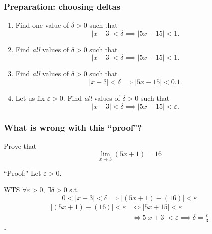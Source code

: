 \documentclass[14pt]{beamer}
\begin{document}
\begin{frame}[t]
	\frametitle{Preparation: choosing deltas}

	\begin{enumerate}
		\item Find one value of $\delta >0$ such that
			\[
				|x-3|< \delta \implies |5x-15|<1.
			\]

		\item Find \emph{all} values of $\delta >0$ such that
			\[
				|x-3|< \delta \implies |5x-15|<1.
			\]

		\item Find \emph{all} values of $\delta >0$ such that
			\[
				|x-3|< \delta \implies |5x-15|<0.1.
			\]

		\item Let us fix $\varepsilon >0$. Find \emph{all} values of $\delta >0$ such
			that
			\[
				|x-3|< \delta \implies |5x-15|<\varepsilon.
			\]
	\end{enumerate}
\end{frame}

\begin{frame}
	\frametitle{What is wrong with this ``proof"?}
	\fontsize{13}{13}\selectfont
	\vspace{-2mm}
	\begin{block}{}%
		Prove that
		\[
			\lim_{x\to 3}(5x+1) = 16
		\]
	\end{block}

	\begin{block}{``Proof:"}
		Let $\varepsilon>0$.

		WTS $\forall \varepsilon>0$, $\exists\delta>0$ s.t.
		\[
			0<|x-3|<\delta \implies |(5x+1) - (16)|<\varepsilon
		\]
		\vspace{-3mm}
		\begin{align*}
			|(5x+1) - (16)|<\varepsilon & \iff |5x+15|<\varepsilon                                     \\
			                            & \iff 5|x+3|<\varepsilon \implies\delta=\frac{\varepsilon}{3}
		\end{align*}
		\hfill $\square$
	\end{block}
\end{frame}
\end{document}
